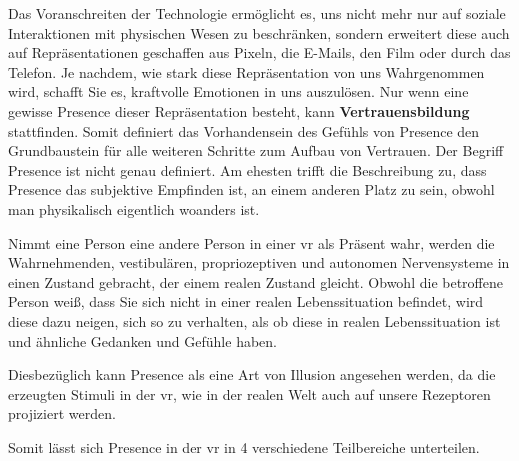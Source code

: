 \documentclass[a4paper,11pt]{article}%
\renewcommand{\\}{\vspace*{0.5\baselineskip} \newline}
\begin{document}
	Das Voranschreiten der Technologie ermöglicht es, uns nicht mehr nur auf soziale Interaktionen mit physischen Wesen zu beschränken, sondern erweitert diese auch auf Repräsentationen geschaffen aus Pixeln, die E-Mails, den Film oder durch das Telefon. Je nachdem, wie stark diese Repräsentation von uns Wahrgenommen wird, schafft Sie es, kraftvolle Emotionen in uns auszulösen.\citep[p. 4-6]{biocca2002defining}\\
Nur wenn eine gewisse \dq{}Presence\dq{} dieser Repräsentation besteht, kann \textbf{Vertrauensbildung} stattfinden. Somit definiert das Vorhandensein des Gefühls von \dq Presence \dq{} den Grundbaustein für alle weiteren Schritte zum Aufbau von Vertrauen.\\
Der Begriff \dq{}Presence\dq{} ist nicht genau definiert. Am ehesten trifft die Beschreibung zu, dass \dq{}Presence\dq{} das subjektive Empfinden ist, an einem anderen Platz zu sein, obwohl man physikalisch eigentlich woanders ist. \citep[p. 1]{witmer1998measuring} 

	Nimmt eine Person eine andere Person in einer \ac{vr} als Präsent wahr, werden die Wahrnehmenden, vestibulären, propriozeptiven und autonomen Nervensysteme in einen Zustand gebracht, der einem realen Zustand gleicht. Obwohl die betroffene Person weiß, dass Sie sich nicht in einer realen Lebenssituation befindet, wird diese dazu neigen, sich so zu verhalten, als ob diese in realen Lebenssituation ist und ähnliche Gedanken und Gefühle haben. \citep{slater2003note}

Diesbezüglich kann \dq{}Presence\dq{} als eine Art von Illusion angesehen werden, da die erzeugten Stimuli in der \ac{vr}, wie in der realen Welt auch auf unsere Rezeptoren projiziert werden.

Somit lässt sich \dq{}Presence\dq{} in der \ac{vr} in 4 verschiedene Teilbereiche unterteilen.
\end{document}
